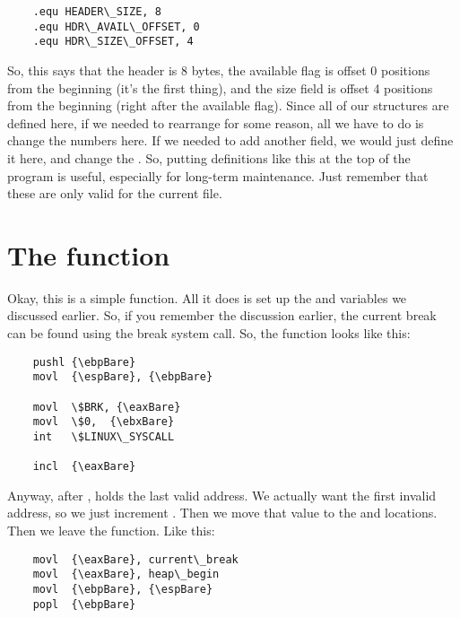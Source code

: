 \begin{simpletyping}
\begin{lstlisting}
	.equ HEADER\_SIZE, 8
	.equ HDR\_AVAIL\_OFFSET, 0
	.equ HDR\_SIZE\_OFFSET, 4
\end{lstlisting}
\end{simpletyping}

So, this says that the header is 8 bytes, the available flag is offset 0 positions from the 
beginning (it's the first thing), and the size field is offset 4 positions from the 
beginning (right after the available flag).  Since all of our structures are defined here,
if we needed to rearrange for some reason, all we have to do is change the numbers here.  If
we needed to add another field, we would just define it here, and change the 
.  So, putting definitions like this at the top of the program
is useful, especially for long-term maintenance.  Just remember that these are only valid
for the current file.

\section{The  function}

Okay, this is a simple function.  All it does is set up the  and
 variables we discussed earlier.  So, if you remember the
discussion earlier, the current break can be found using the break system call.  So, the function
looks like this:

\begin{simpletyping}
\begin{lstlisting}
	pushl {\ebpBare}
	movl  {\espBare}, {\ebpBare}

	movl  \$BRK, {\eaxBare}
	movl  \$0,  {\ebxBare}
	int   \$LINUX\_SYSCALL

	incl  {\eaxBare}
\end{lstlisting}
\end{simpletyping}

Anyway, after , \icode{{\eaxBare}} holds the last valid address.  
We actually want the first invalid address, so we just increment \icode{{\eaxBare}}.  Then
we move that value to the  and 
locations.  Then we leave the function.  Like this:

\begin{simpletyping}
\begin{lstlisting}
	movl  {\eaxBare}, current\_break
	movl  {\eaxBare}, heap\_begin
	movl  {\ebpBare}, {\espBare}
	popl  {\ebpBare}
\end{lstlisting}
\end{simpletyping}

